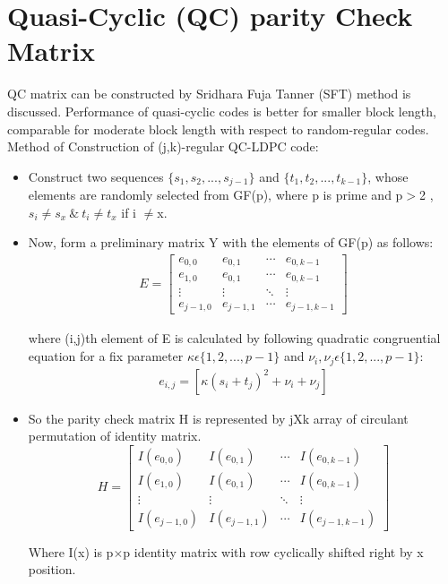\section{Quasi-Cyclic (QC) parity Check Matrix}
QC matrix can be constructed by 
Sridhara Fuja Tanner (SFT)\cite{3} method is discussed. Performance of quasi-cyclic codes is better for smaller block length, comparable for moderate block length with respect to random-regular codes.\\
Method of Construction of (j,k)-regular QC-LDPC code:
\begin{itemize}
\item Construct two sequences $\{s_1,s_2,...,s_{j-1}\}$ and $\{t_1,t_2,...,t_{k-1}\}$, whose elements are randomly selected from GF(p), where p is prime and p$>$2 , $s_i \neq s_x \ \& \ t_i \neq t_x$ if i $\neq$x.
\item Now, form a preliminary matrix Y with the elements of GF(p) as follows:
\begin{align}
 E= \left[ \begin{array}{cccc}
e_{0,0} & e_{0,1} & \cdots & e_{0,k-1} \\
e_{1,0} & e_{0,1} & \cdots & e_{0,k-1} \\
\vdots & \vdots & \ddots & \vdots \\
e_{j-1,0} & e_{j-1,1} & \cdots & e_{j-1,k-1} 
\end{array} \right] 
\end{align}
 
where (i,j)th element of E is calculated by following quadratic congruential equation for a fix parameter
$\kappa\epsilon\{1,2,...,p-1\} $ and $\nu_i,\nu_j\epsilon\{1,2,...,p-1\} $: 
\begin{align}
 e_{i,j}=[\kappa(s_i+t_j)^2 + \nu_i +\nu_j] 
\end{align}
\item So the parity check matrix H is represented by jXk array of circulant permutation of identity matrix. 
\[
 H= \left[ \begin{array}{cccc}
I(e_{0,0}) & I(e_{0,1}) & \cdots & I(e_{0,k-1}) \\
I(e_{1,0}) & I(e_{0,1}) & \cdots & I(e_{0,k-1}) \\
\vdots & \vdots & \ddots & \vdots \\
I(e_{j-1,0}) & I(e_{j-1,1}) & \cdots & I(e_{j-1,k-1}) 
\end{array} \right] \]

 
Where I(x) is p$\times$p identity matrix with row cyclically shifted right by x position.
\end{itemize}

